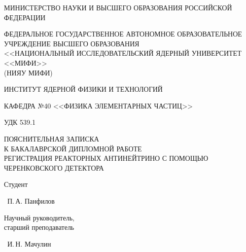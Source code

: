 \documentclass[a4paper,12pt]{extarticle}
\begin{document}
\begin{titlepage}
\begin{center}
    \footnotesize
    \MakeTextUppercase{Министерство науки и высшего образования Российской Федерации}
    \smallskip

    \MakeTextUppercase{Федеральное государственное автономное образовательное учреждение высшего образования}\\
    \MakeTextUppercase{<<Национальный исследовательский ядерный университет <<МИФИ>>}\\
    (НИЯУ МИФИ)
    \bigskip

    \MakeTextUppercase{Институт ядерной физики и технологий}
    \smallskip

    \MakeTextUppercase{Кафедра №40 <<Физика элементарных частиц>>}

    \vspace{2\baselineskip}

    \begin{flushleft}
    УДК 539.1
    \end{flushleft}

    \vspace{2\baselineskip}

    \normalsize
    \begin{bfseries}
    \MakeTextUppercase{Пояснительная записка}\\
    \MakeTextUppercase{к бакалаврской дипломной работе}\\
    \MakeTextUppercase{Регистрация реакторных антинейтрино с помощью черенковского детектора}
    \end{bfseries}

    \vspace{2\baselineskip}

    \begin{minipage}[b][\baselineskip][b]{0.4\textwidth}
    Студент
    \end{minipage}
    \hspace{1cm}
    \begin{minipage}[b][\baselineskip][b]{0.5\textwidth}
    \underline{\hspace{2cm}}~П.\,А. Панфилов
    \end{minipage}

    \begin{minipage}[b][2\baselineskip][b]{0.4\textwidth}
    Научный руководитель,\\
    старший преподаватель
    \end{minipage}
    \hspace{1cm}
    \begin{minipage}[b][2\baselineskip][b]{0.5\textwidth}
    \underline{\hspace{2cm}}~И.\,Н. Мачулин
    \end{minipage}


\end{center}
\end{titlepage}
\end{document}
